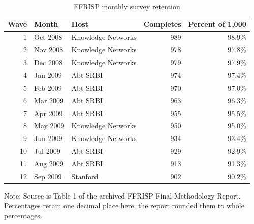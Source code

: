 \begin{table}[H]
\centering
\caption{\label{tab:ffrisp-retention}FFRISP monthly survey retention}
\centering
\begin{threeparttable}
\begin{tabular}[t]{rllrr}
\toprule
Wave & Month & Host & Completes & Percent of 1,000\\
\midrule
1 & Oct 2008 & Knowledge Networks & 989 & 98.9\%\\
2 & Nov 2008 & Knowledge Networks & 978 & 97.8\%\\
3 & Dec 2008 & Knowledge Networks & 979 & 97.9\%\\
4 & Jan 2009 & Abt SRBI & 974 & 97.4\%\\
5 & Feb 2009 & Abt SRBI & 970 & 97.0\%\\
6 & Mar 2009 & Abt SRBI & 963 & 96.3\%\\
7 & Apr 2009 & Abt SRBI & 955 & 95.5\%\\
8 & May 2009 & Knowledge Networks & 950 & 95.0\%\\
9 & Jun 2009 & Knowledge Networks & 934 & 93.4\%\\
10 & Jul 2009 & Abt SRBI & 929 & 92.9\%\\
11 & Aug 2009 & Abt SRBI & 913 & 91.3\%\\
12 & Sep 2009 & Stanford & 902 & 90.2\%\\
\bottomrule
\end{tabular}
\begin{tablenotes}[para]
\item Note: Source is Table 1 of the archived FFRISP Final Methodology Report. Percentages retain one decimal place here; the report rounded them to whole percentages.
\end{tablenotes}
\end{threeparttable}
\end{table}
